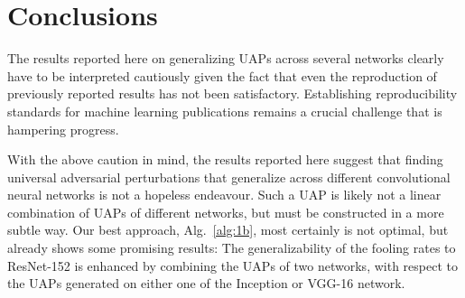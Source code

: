 \documentclass[runningheads]{llncs}
\begin{document}
\section{Conclusions}
The results reported here on generalizing UAPs across several networks clearly have to be interpreted cautiously given the fact that even the reproduction of previously reported results has not been satisfactory. Establishing reproducibility standards for machine learning publications remains a crucial challenge that is hampering progress.

With the above caution in mind, the results reported here suggest that finding universal adversarial perturbations that generalize across different convolutional neural networks is not a hopeless endeavour. Such a UAP is likely not a linear combination of UAPs of different networks, but must be constructed in a more subtle way. Our best approach, Alg.~\ref{alg:1b}, most certainly is not optimal, but already shows some promising results: The generalizability of the fooling rates to ResNet-152 is enhanced by combining the UAPs of two networks, with respect to the UAPs generated on either one of the Inception or VGG-16 network.



\end{document}
